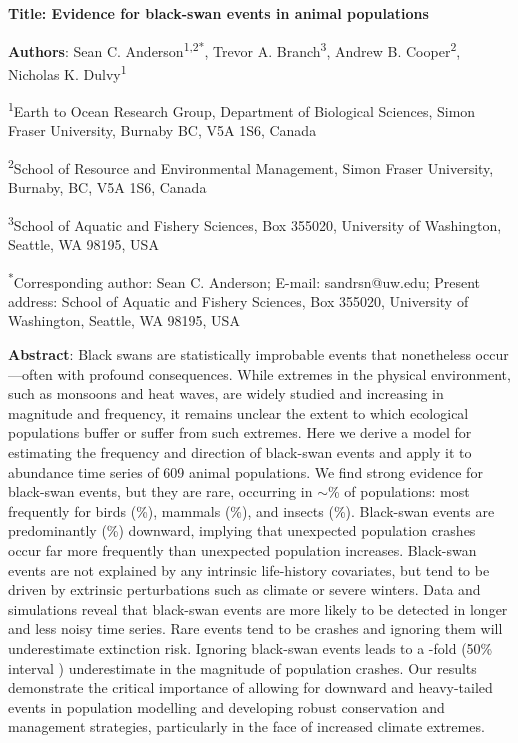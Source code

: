 \textbf{Title: Evidence for black-swan events in animal populations}

\textbf{Authors}: Sean C. Anderson\textsuperscript{1,2*}, Trevor A. Branch\textsuperscript{3}, Andrew B. Cooper\textsuperscript{2}, Nicholas K. Dulvy\textsuperscript{1}

\textsuperscript{1}Earth to Ocean Research Group, Department of Biological Sciences, Simon Fraser University, Burnaby BC, V5A 1S6, Canada

\textsuperscript{2}School of Resource and Environmental Management, Simon Fraser University, Burnaby, BC, V5A 1S6, Canada

\textsuperscript{3}School of Aquatic and Fishery Sciences, Box 355020, University of Washington, Seattle, WA 98195, USA

\textsuperscript{*}Corresponding author: Sean C. Anderson; E-mail: sandrsn@uw.edu; Present address: School of Aquatic and Fishery Sciences, Box 355020, University of Washington, Seattle, WA 98195, USA


\textbf{Abstract}:
Black swans are statistically improbable events that nonetheless occur---often with profound consequences\cite{taleb2007, sornette2009}. While extremes in the physical environment, such as monsoons and heat waves, are widely studied and increasing in magnitude and frequency\cite{meehl2004, katz2005, ipcc2012}, it remains unclear the extent to which ecological populations buffer or suffer from such extremes. Here we derive a model for estimating the frequency and direction of black-swan events and apply it to abundance time series of 609 animal populations. We find strong evidence for black-swan events, but they are rare, occurring in \(\sim\)\overallBasePerc \% of populations: most frequently for birds (\birdPH \%), mammals (\mammalsPH \%), and insects (\insectsPH \%). Black-swan events are predominantly (\percBSDown \%) downward, implying that unexpected population crashes occur far more frequently than unexpected population increases. Black-swan events are not explained by any intrinsic life-history covariates, but tend to be driven by extrinsic perturbations such as climate or severe winters. Data and simulations reveal that black-swan events are more likely to be detected in longer and less noisy time series. Rare events tend to be crashes and ignoring them will underestimate extinction risk. Ignoring black-swan events leads to a \crashUnderMedian-fold (50\% interval \crashUnderRange) underestimate in the magnitude of population crashes. Our results demonstrate the critical importance of allowing for downward and heavy-tailed events in population modelling and developing robust conservation and management strategies, particularly in the face of increased climate extremes.

